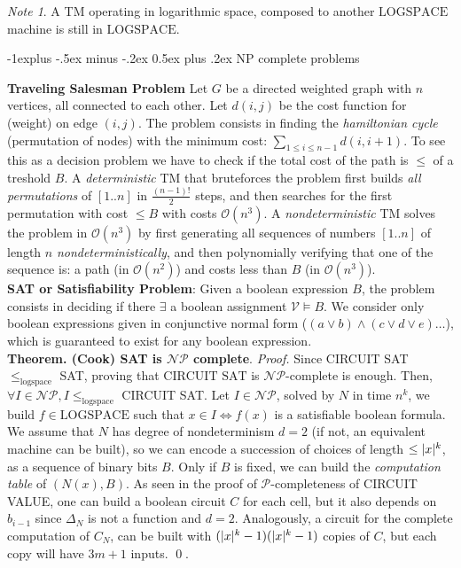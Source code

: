 \documentclass[10pt,landscape]{article}
\makeatletter
\newcommand{\V}{\mathcal{V}}
\renewcommand{\O}{\mathcal{O}}
\renewcommand{\P}{\mathcal{P}}
\newcommand{\NP}{\mathcal{NP}}
\newcommand{\LOGSPACE}{\mathrm{LOGSPACE}}
\DeclarePairedDelimiter\abs{\lvert}{\rvert}
\newcommand{\red}[1]{\leqslant_{#1}}
\renewcommand{\iff}{\Leftrightarrow}
\theoremstyle{plain}%
\theoremstyle{definition}
\theoremstyle{remark}
\newtheorem*{note}{Note}
\renewcommand{\subsection}{\@startsection{subsection}{2}{0mm}%
                                {-1explus -.5ex minus -.2ex}%
                                {0.5ex plus .2ex}%
                                {\normalfont\normalsize\bfseries}}
\makeatother
\begin{document}
\begin{multicols}{4}
\begin{note}
    A TM operating in logarithmic space, composed to another $\LOGSPACE$ machine is still in $\LOGSPACE$. 
\end{note}

\subsection{NP complete problems}

\textbf{Traveling Salesman Problem}
Let $G$ be a directed weighted graph with $n$ vertices, all connected to each other.
Let $d(i,j)$ be the cost function for (weight) on edge $(i,j)$. The problem consists in finding 
the \textit{hamiltonian cycle} (permutation of nodes) with the minimum cost: $\sum_{1 \leq i \leq n-1} d(i,i+1)$.
To see this as a decision problem we have to check if the total cost of the path is $\leq$ of a treshold $B$.
A \textit{deterministic} TM that bruteforces the problem first builds \textit{all permutations} of $[1..n]$
in $\frac{(n-1)!}{2}$ steps, and then searches for the first permutation with cost $\leq B$ 
with costs $\O(n^3)$. A \textit{nondeterministic} TM solves the problem in $\O(n^3)$
by first generating all sequences of numbers $[1..n]$ of length $n$ \textit{nondeterministically},
and then polynomially verifying that one of the sequence is: a path (in $\O(n^2)$) and 
costs less than $B$ (in $\O(n^3)$).  \\[.2cm]

\textbf{SAT or Satisfiability Problem}:
Given a boolean expression $B$, the problem consists in deciding if there $\exists$ a 
boolean assignment $\V \vDash B$. We consider only boolean expressions given in conjunctive
normal form ($(a \lor b) \land (c \lor d \lor e) \hdots$), which is guaranteed to exist for
any boolean expression. \\[.2cm]

\textbf{Theorem. (Cook) SAT is $\NP$ complete}. \textit{Proof.}
Since CIRCUIT SAT $\red{\text{logspace}}$ SAT, proving that $\text{CIRCUIT SAT}$ is $\NP$-complete
is enough. Then, $\forall I \in \NP, I \red{\text{logspace}}$ CIRCUIT SAT.
Let $I \in \NP$, solved by $N$ in time $n^k$, we build $f \in \LOGSPACE$ such that $x \in I \iff f(x) $ is a satisfiable boolean formula.
We assume that $N$ has degree of nondeterminism $d=2$ (if not, an equivalent machine can be built), so we can encode
a succession of choices of length $\leq \abs{x}^k$, as a sequence of binary bits $B$. Only if $B$ is fixed,
we can build the \textit{computation table} of $(N(x),B)$. As seen in the proof of $\P$-completeness 
of CIRCUIT VALUE, one can build a boolean circuit $C$ for each cell, but it also depends on $b_{i-1}$ since
$\Delta_N$ is not a function and $d=2$. Analogously, a circuit for the complete computation of 
$C_N$, can be built with $(\abs{x}^k-1)(\abs{x}^k-1)$ copies of $C$, but each copy will have $3m+1$ inputs.
\qed. \\[.2cm]


\end{multicols}
\end{document}

